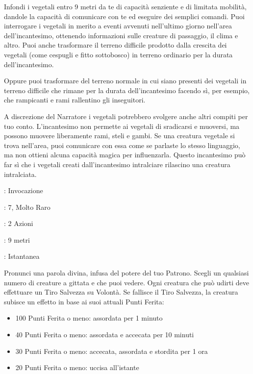 \begin{multicols}{2}
Infondi i vegetali entro 9 metri da te di capacità senziente e di limitata mobilità, dandole la capacità di comunicare con te ed eseguire dei semplici comandi. Puoi interrogare i vegetali in merito a eventi avvenuti nell'ultimo giorno nell'area dell'incantesimo, ottenendo informazioni sulle creature di passaggio, il clima e altro. Puoi anche trasformare il terreno difficile prodotto dalla crescita dei vegetali (come cespugli e fitto sottobosco) in terreno ordinario per la durata dell'incantesimo.

Oppure puoi trasformare del terreno normale in cui siano presenti dei vegetali in terreno difficile che rimane per la durata dell'incantesimo facendo sì, per esempio, che rampicanti e rami rallentino gli inseguitori.

A discrezione del Narratore i vegetali potrebbero svolgere anche altri compiti per tuo conto. L'incantesimo non permette ai vegetali di sradicarsi e muoversi, ma possono muovere liberamente rami, steli e gambi. Se una creatura vegetale si trova nell'area, puoi comunicare con essa come se parlaste lo stesso linguaggio, ma non ottieni alcuna capacità magica per influenzarla. Questo incantesimo può far sì che i vegetali creati dall'incantesimo intralciare rilascino una creatura intralciata.

\noindent\colorbox{OBSSgold!10}{
\begin{minipage}{0.95\linewidth}
\begin{description}[noitemsep, topsep=0pt, parsep=0pt, partopsep=0pt, leftmargin=0cm, labelwidth=1.3cm]
	\item[\textbf{Lista}]: Invocazione
	\item[\textbf{Livello}]: 7, Molto Raro
	\item[\textbf{Lancio}]: 2 Azioni
	\item[\textbf{Gittata}]: 9 metri
	\item[\textbf{Durata}]: Istantanea
\end{description}
\end{minipage}}\smallskip

Pronunci una parola divina, infusa del potere del tuo Patrono. Scegli un qualsiasi numero di creature a gittata e che puoi vedere. Ogni creatura che può udirti deve effettuare un Tiro Salvezza su Volontà. Se fallisce il Tiro Salvezza, la creatura subisce un effetto in base ai suoi attuali Punti Ferita:

\begin{itemize}[leftmargin=*] \setlength{\itemsep}{0pt}
	\item 100 Punti Ferita o meno: assordata per 1 minuto
	\item 40 Punti Ferita o meno: assordata e accecata per 10 minuti
	\item 30 Punti Ferita o meno: accecata, assordata e stordita per 1 ora
	\item 20 Punti Ferita o meno: uccisa all'istante
\end{itemize}


\end{multicols}

